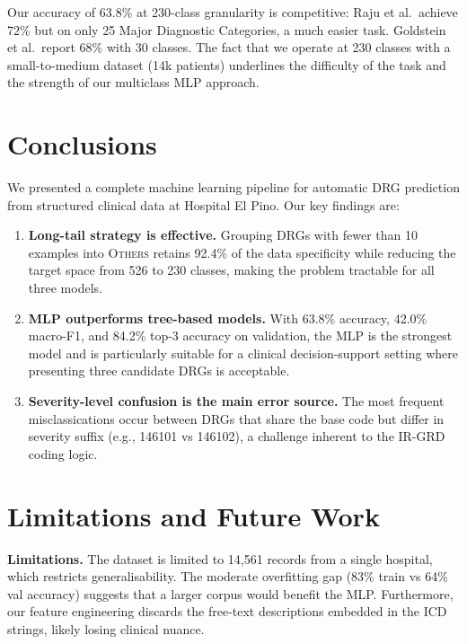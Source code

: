 \documentclass{IEEEtran}
\begin{document}
Our accuracy of 63.8\% at 230-class granularity is competitive:
Raju et al.~achieve 72\% but on only 25 Major Diagnostic Categories,
a much easier task.
Goldstein et al.~report 68\% with 30 classes.
The fact that we operate at 230 classes with a small-to-medium
dataset (14k patients) underlines the difficulty of the task
and the strength of our multiclass MLP approach.

\section{Conclusions}

We presented a complete machine learning pipeline for automatic
DRG prediction from structured clinical data at Hospital El Pino.
Our key findings are:

\begin{enumerate}
  \item \textbf{Long-tail strategy is effective.}
        Grouping DRGs with fewer than 10 examples into
        \textsc{Others} retains 92.4\% of the data specificity
        while reducing the target space from 526 to 230 classes,
        making the problem tractable for all three models.

  \item \textbf{MLP outperforms tree-based models.}
        With 63.8\% accuracy, 42.0\% macro-F1, and 84.2\%
        top-3 accuracy on validation, the MLP is the strongest
        model and is particularly suitable for a clinical
        decision-support setting where presenting three candidate
        DRGs is acceptable.

  \item \textbf{Severity-level confusion is the main error source.}
        The most frequent misclassications occur between DRGs
        that share the base code but differ in severity suffix
        (e.g., 146101 vs 146102), a challenge inherent to the
        IR-GRD coding logic.
\end{enumerate}

\section{Limitations and Future Work}

\textbf{Limitations.}
The dataset is limited to 14{,}561 records from a single hospital,
which restricts generalisability.
The moderate overfitting gap (83\% train vs 64\% val accuracy)
suggests that a larger corpus would benefit the MLP.
Furthermore, our feature engineering discards the free-text
descriptions embedded in the ICD strings, likely losing
clinical nuance.
\end{document}
